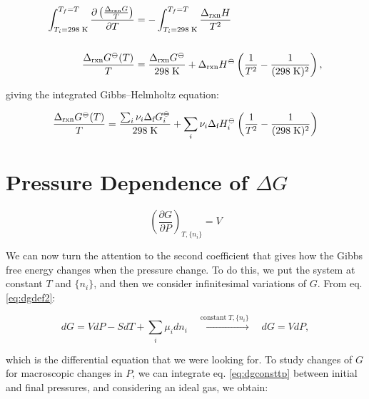\documentclass[
]{book}
\theoremstyle{definition}
\theoremstyle{definition}
\theoremstyle{definition}
\theoremstyle{remark}
\begin{document}
\begin{equation}
\begin{aligned}
\int_{T_i=298 \;\text{K}}^{T_f=T}  \frac{\partial\left( \frac{\Delta_{\text{rxn}} G}{T} \right)}{\partial T} &=  - \int_{T_i=298 \;\text{K}}^{T_f=T}  \frac{\Delta_{\text{rxn}} H}{T^2} \\ \\ \frac{\Delta_{\text{rxn}} G^{-\kern-6pt{\ominus}\kern-6pt-}(T)}{T} &=  \frac{\Delta_{\text{rxn}} G^{-\kern-6pt{\ominus}\kern-6pt-}}{298 \;\text{K}} + \Delta_{\text{rxn}} H^{-\kern-6pt{\ominus}\kern-6pt-}\left( \frac{1}{T^2} -\frac{1}{(298 \;\text{K})^2} \right),
\end{aligned}
\label{eq:gibbshelmIbase}
\end{equation}

giving the integrated Gibbs--Helmholtz equation:

\begin{equation}
\frac{\Delta_{\text{rxn}} G^{-\kern-6pt{\ominus}\kern-6pt-}(T)}{T} =  \frac{\sum_i \nu_i \Delta_{\text{f}} G_i^{-\kern-6pt{\ominus}\kern-6pt-}}{298 \;\text{K}} + \sum_i \nu_i \Delta_{\text{f}} H_i^{-\kern-6pt{\ominus}\kern-6pt-}\left( \frac{1}{T^2} -\frac{1}{(298 \;\text{K})^2} \right)
\label{eq:gibbshelmI}
\end{equation}

\hypertarget{pressure-dependence-of-delta-g}{%
\section{\texorpdfstring{Pressure Dependence of \(\Delta G\)}{Pressure Dependence of \textbackslash Delta G}}\label{pressure-dependence-of-delta-g}}

\[
\left(\frac{\partial G}{\partial P} \right)_{T,\{n_i\}}=V
\]

We can now turn the attention to the second coefficient that gives how the Gibbs free energy changes when the pressure change. To do this, we put the system at constant \(T\) and \(\{n_i\}\), and then we consider infinitesimal variations of \(G\). From eq. \eqref{eq:dgdef2}:

\begin{equation}
dG = VdP -SdT +\sum_i\mu_i dn_i \quad \xrightarrow{\text{constant}\; T,\{n_i\}} \quad dG = VdP,
\label{eq:dgconsttp}
\end{equation}

which is the differential equation that we were looking for. To study changes of \(G\) for macroscopic changes in \(P\), we can integrate eq. \eqref{eq:dgconsttp} between initial and final pressures, and considering an ideal gas, we obtain:
\end{document}

